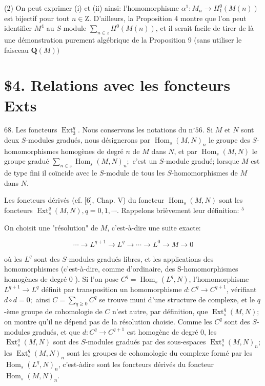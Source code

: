 (2) On peut exprimer (i) et (ii) ainsi: l'homomorphisme $\alpha^{1}: M_{n} \rightarrow H_{1}^{0}(M(n))$ est bijectif pour tout $n \in \mathrm{Z} .$ D'ailleurs, la Proposition 4 montre que l'on peut identifier $M^{4}$ au $S$-module $\sum_{n \in z} H^{0}(M(n))$, et il serait facile de tirer de là une démonstration purement algébrique de la Proposition 9 (sans utiliser le faisceau $\boldsymbol{Q}(M))$

\section{\$4. Relations avec les foncteurs Exts}

68. Les foncteurs $\operatorname{Ext}_{3}^{q}$. Nous conservons les notations du $\mathrm{n}^{\circ} 56 .$ Si $M$ et $N$ sont deux $S$-modules gradués, nous désignerons par $\operatorname{Hom}_{s}(M, N)_{n}$ le groupe des $S$-homomorphismes homogènes de degré $n$ de $M$ dans $N$, et par $\operatorname{Hom}_{s}(M, N)$ le groupe gradué $\sum_{n \in z} \operatorname{Hom}_{s}(M, N)_{n} ;$ c'est un $S$-module gradué; lorsque $M$ est de type fini il coïncide avec le $S$-module de tous les $S$-homomorphismes de $M$ dans $N$.

Les foncteurs dérivés (cf. [6], Chap. V) du foncteur $\operatorname{Hom}_{s}(M, N)$ sont les foncteurs $\operatorname{Ext}_{s}^{q}(M, N), q=0,1, \cdots$. Rappelons brièvement leur définition: $^{5}$

On choisit une "résolution" de $M$, c'est-à-dire une suite exacte:

$$
\cdots \rightarrow L^{q+1} \rightarrow L^{q} \rightarrow \cdots \rightarrow L^{0} \rightarrow M \rightarrow 0
$$

où les $L^{q}$ sont des $S$-modules gradués libres, et les applications des homomorphismes (c'est-à-dire, comme d'ordinaire, des S-homomorphismes homogènes de degré 0 ). Si l'on pose $C^{q}=\operatorname{Hom}_{s}\left(L^{q}, N\right)$, l'homomorphisme $L^{q+1} \rightarrow L^{q}$ définit par transposition un homomorphisme $d: C^{q} \rightarrow C^{q+1}$, vérifiant $d \circ d=0 ;$ ainsi $C=\sum_{q \geq 0} C^{q}$ se trouve muni d'une structure de complexe, et le $q$-ème groupe de cohomologie de $C$ n'est autre, par définition, que $\operatorname{Ext}_{s}^{q}(M, N) ;$ on montre qu'il ne dépend pas de la résolution choisie. Comme les $C^{q}$ sont des $S$-modules gradués, et que $d: C^{q} \rightarrow C^{q+1}$ est homogène de degré 0, les $\operatorname{Ext}_{s}^{q}(M, N)$ sont des $S$-modules gradués par des sous-espaces $\operatorname{Ext}_{s}^{q}(M, N)_{n} ;$ les $\operatorname{Ext}_{s}^{q}(M, N)_{n}$ sont les groupes de cohomologie du complexe formé par les $\operatorname{Hom}_{s}\left(L^{q}, N\right)_{n}$, c'est-àdire sont les foncteurs dérivés du foncteur $\operatorname{Hom}_{s}(M, N)_{n}$.

